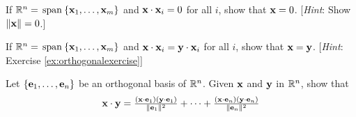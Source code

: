 \begin{multicols}{2}
\begin{ex}\label{ex:orthogonalexercise}
If $\mathbb{R}^n = \thinspace\operatorname{span\medspace}\{\textbf{x}_{1}, \dots, \textbf{x}_{m}\}$ and \newline $\textbf{x} \cdot \textbf{x}_{i} = 0$ for all $i$, show that $\textbf{x} = 0$. [\textit{Hint}: Show $\|\textbf{x}\| = 0$.]
\end{ex}

\begin{ex}
If $\mathbb{R}^n = \thinspace\operatorname{span\medspace}\{\textbf{x}_{1}, \dots, \textbf{x}_{m}\}$ and $\textbf{x} \cdot \textbf{x}_{i} = \textbf{y} \cdot \textbf{x}_{i}$ for all $i$, show that $\textbf{x} = \textbf{y}$. [\textit{Hint}: Exercise \ref{ex:orthogonalexercise}]
\end{ex}

\begin{ex}
Let $\{\textbf{e}_{1}, \dots, \textbf{e}_{n}\}$ be an orthogonal basis of $\mathbb{R}^n$. Given $\textbf{x}$ and $\textbf{y}$ in $\mathbb{R}^n$, show that
\begin{equation*}
\textbf{x} \cdot \textbf{y} = \tfrac{(\textbf{x} \cdot \textbf{e}_1)(\textbf{y} \cdot \textbf{e}_1)}{\|\textbf{e}_1\|^2} +
\dots +
\tfrac{(\textbf{x} \cdot \textbf{e}_n)(\textbf{y} \cdot \textbf{e}_n)}{\|\textbf{e}_n\|^2}
\end{equation*}
\end{ex}
\end{multicols}
